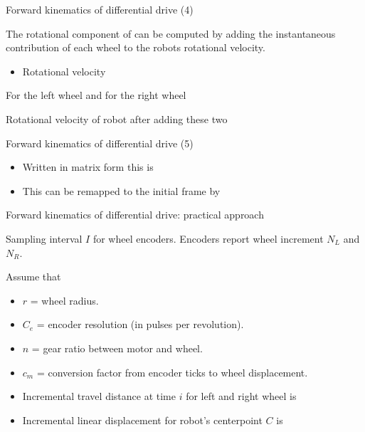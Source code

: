 \documentclass[compress]{beamer}
\begin{document}
\begin{frame}{Forward kinematics of differential drive (4)}

The rotational component of can be computed by adding the instantaneous
contribution of each wheel to the robots rotational velocity.

\begin{itemize}
    \item Rotational velocity
\end{itemize}

For the left wheel and for the right wheel

Rotational velocity of robot after adding these two

\end{frame}

\begin{frame}{Forward kinematics of differential drive (5)}

\begin{itemize}
    \item Written in matrix form this is
    \item This can be remapped to the initial frame by
\end{itemize}

\end{frame}

\begin{frame}{Forward kinematics of differential drive: practical
approach}

Sampling interval $I$ for wheel encoders. Encoders report wheel
increment $N_L$ and $N_R$.

Assume that

\begin{itemize}
    \item $r$ = wheel radius.
    \item $C_e$ = encoder resolution (in pulses per revolution).
    \item $n$ = gear ratio between motor and wheel.
    \item $c_m$ = conversion factor from encoder ticks to wheel
  displacement.
\end{itemize}

\end{frame}

\begin{frame}{}

\begin{itemize}
    \item Incremental travel distance at time $i$ for left and right wheel
  is
    \item Incremental linear displacement for robot's centerpoint $C$ is
\end{itemize}

\end{frame}
\end{document}
